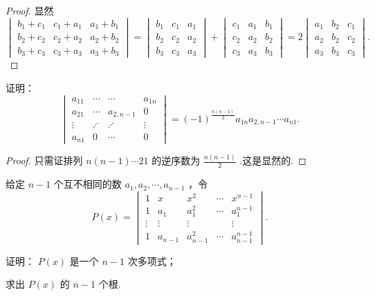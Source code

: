 \begin{proof}
	显然
	\[
		\begin{vmatrix}
			b_1+c_1 & c_1+a_1 & a_1+b_1 \\
			b_2+c_2 & c_2+a_2 & a_2+b_2 \\
			b_3+c_3 & c_3+a_3 & a_3+b_3
		\end{vmatrix}
		=\begin{vmatrix}
			b_1 & c_1 & a_1 \\
			b_2 & c_2 & a_2 \\
			b_3 & c_3 & a_3
		\end{vmatrix}+\begin{vmatrix}
			c_1 & a_1 & b_1 \\
			c_2 & a_2 & b_2 \\
			c_3 & a_3 & b_3
		\end{vmatrix}=2
		\begin{vmatrix}
			a_1 & b_2 & c_1 \\
			a_2 & b_2 & c_2 \\
			a_3 & b_3 & c_3
		\end{vmatrix}.
	\]
\end{proof}
\begin{prob}[23]
	证明：
	\[
		\begin{vmatrix}
			a_{11} & \cdots  & \cdots    & a_{1n} \\
			a_{21} & \cdots  & a_{2,n-1} & 0      \\
			\vdots & \iddots & \iddots   & \vdots \\
			a_{n1} & 0       & \cdots    & 0
		\end{vmatrix}
		=(-1)^{\frac{n(n-1)}{2}}a_{1n}a_{2,n-1}\cdots a_{n1}.
	\]
\end{prob}
\begin{proof}
	只需证排列 $n(n-1)\cdots 21$ 的逆序数为 $\frac{n(n-1)}{2}$ .这是显然的.
\end{proof}
\begin{prob}[24]
	给定 $n-1$ 个互不相同的数 $a_1,a_2,\cdots,a_{n-1}$ ，令
	\[
		P(x)=
		\begin{vmatrix}
			1      & x       & x^2       & \cdots & x^{n-1}       \\
			1      & a_1     & a_1^2     & \cdots & a_1^{n-1}     \\
			\vdots & \vdots  & \vdots    &        & \vdots        \\
			1      & a_{n-1} & a_{n-1}^2 & \cdots & a_{n-1}^{n-1}
		\end{vmatrix}.
	\]
	\begin{mylist}
		\item 证明： $P(x)$ 是一个 $n-1$ 次多项式；
		\item 求出 $P(x)$ 的 $n-1$ 个根.
	\end{mylist}
\end{prob}
